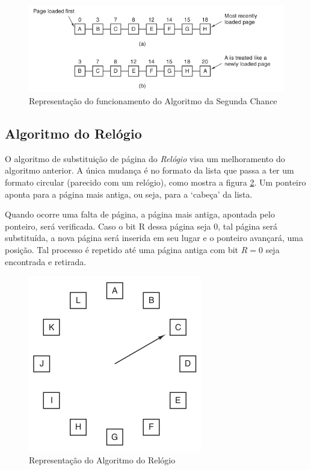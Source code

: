 \begin{figure}
	\includegraphics[scale=0.6]{ram-second-chance-1.png}
    \centering
    \caption{Representação do funcionamento do Algoritmo da Segunda Chance}
    \label{ram-second-chance-1}
\end{figure}

\subsection{Algoritmo do Relógio}

O algoritmo de substituição de página do \textit{Relógio} visa um melhoramento do algoritmo anterior. A única mudança é no formato da lista que passa a ter um formato circular (parecido com um relógio), como mostra a figura \ref{ram-clock-1}. Um ponteiro aponta para a página mais antiga, ou seja, para a `cabeça' da lista.

Quando ocorre uma falta de página, a página mais antiga, apontada pelo ponteiro, será verificada. Caso o bit R dessa página seja 0, tal página será substituída, a nova página será inserida em seu lugar e o ponteiro avançará, uma posição. Tal processo é repetido até uma página antiga com bit $R = 0$ seja encontrada e retirada.

\begin{figure}
	\includegraphics[scale=0.6]{ram-clock-1.png}
    \centering
    \caption{Representação do Algoritmo do Relógio}
    \label{ram-clock-1}
\end{figure}

